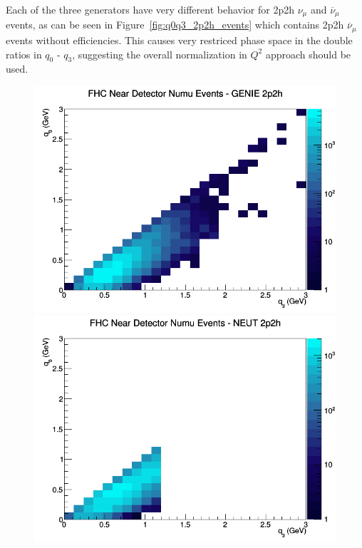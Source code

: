 \documentclass[12pt]{article}
\begin{document}
\FloatBarrier
Each of the three generators have very different behavior for 2p2h $\nu_\mu$ and $\overline{\nu}_{\mu}$ events, as can be seen in Figure~\ref{fig:q0q3_2p2h_events} which contains 2p2h $\overline{\nu}_{\mu}$ events without efficiencies. This causes very restriced phase space in the double ratios in $q_0 \textrm{ - } q_3$, suggesting the overall normalization in $Q^2$ approach should be used.
\begin{figure}[h]
\centering
{}
\includegraphics[width=\linewidth]{q0_q3/nominal/2p2h_FHC_ND_numu_q3_q0_GENIE.png}
\endminipage
{}
\includegraphics[width=\linewidth]{q0_q3/nominal/2p2h_FHC_ND_numu_q3_q0_NEUT.png}
\endminipage
{}

\end{figure}
\end{document}
